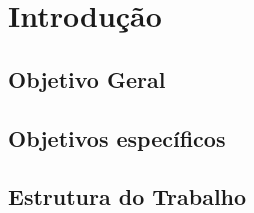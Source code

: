 \chapter{Introdução}\label{sec:introducao}

\section{Objetivo Geral}\label{sec:objetivo-geral}

\section{Objetivos específicos}\label{sec:objetivos-especificos}

\section{Estrutura do Trabalho}\label{sec:estrutura-trabalho}





